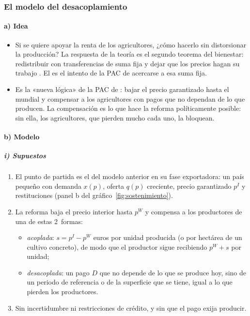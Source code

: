 \documentclass[11pt]{article}
\begin{document}
\subsubsection{El modelo del desacoplamiento}\label{sec:modelo-desacoplamiento}

\paragraph{a) Idea}

\begin{itemize}
\item Si se quiere apoyar la renta de los agricultores, ¿cómo hacerlo sin distorsionar la producción? La respuesta de la teoría es el segundo teorema del bienestar: redistribuir con transferencias de suma fija y dejar que los precios hagan su trabajo . El  es el intento de la PAC de acercarse a esa suma fija.
\item Es la «nueva lógica» de la PAC de \textcite{BaldwinWyplosz2020Economics}: bajar el precio garantizado hasta el mundial y compensar a los agricultores con pagos que no dependan de lo que producen. La compensación es lo que hace la reforma políticamente posible: sin ella, los agricultores, que pierden mucho cada uno, la bloquean.
\end{itemize}

\paragraph{b) Modelo}

\subparagraph{i) Supuestos}

\begin{enumerate}
\item El punto de partida es el del modelo anterior en su fase exportadora: un país pequeño con demanda $x(p)$, oferta $q(p)$ creciente, precio garantizado $p^I$ y restituciones (panel b del gráfico~\ref{fig:sostenimiento}).
\item La reforma baja el precio interior hasta $p^W$ y compensa a los productores de una de estas 2~formas:
  \begin{itemize}
  \item \emph{acoplada}: $s=p^I-p^W$ euros por unidad producida (o por hectárea de un cultivo concreto), de modo que el productor sigue recibiendo $p^W+s$ por unidad;
  \item \emph{desacoplada}: un pago $D$ que no depende de lo que se produce hoy, sino de un periodo de referencia o de la superficie que se tiene, igual a lo que pierden los productores.
  \end{itemize}
\item Sin incertidumbre ni restricciones de crédito, y sin que el pago exija producir.
\end{enumerate}
\end{document}
